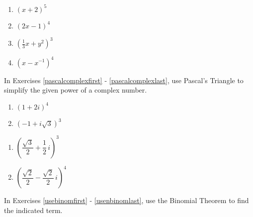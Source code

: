 \documentclass{ximera}
\begin{document}
\begin{multicols}{4}
\begin{enumerate}
\setcounter{enumi}{\value{HW}}


\item  $(x+2)^5$ \label{pascalfirst}

\item  $(2x-1)^4$

\item  $\left(\frac{1}{3} x +  y^2\right)^3$

\item  $\left(x - x^{-1} \right)^{4}$ \label{pascallast}

\setcounter{HW}{\value{enumi}}
\end{enumerate}
\end{multicols}

In Exercises \ref{pascalcomplexfirst} - \ref{pascalcomplexlast},   use Pascal's Triangle to simplify the given power of a complex number.

\begin{multicols}{2}
\begin{enumerate}
\setcounter{enumi}{\value{HW}}

\item  $(1+2i)^4$ \label{pascalcomplexfirst}

\item  $\left(-1 + i \sqrt{3}\right)^3$

\setcounter{HW}{\value{enumi}}
\end{enumerate}
\end{multicols}

\begin{multicols}{2}
\begin{enumerate}
\setcounter{enumi}{\value{HW}}

\item  $\left(\dfrac{\sqrt{3}}{2} +  \dfrac{1}{2}\, i\right)^3$

\item  $\left(\dfrac{\sqrt{2}}{2} - \dfrac{\sqrt{2}}{2} \, i\right)^4$  \label{pascalcomplexlast}

\setcounter{HW}{\value{enumi}}
\end{enumerate}
\end{multicols}

In Exercises \ref{usebinomfirst} - \ref{usenbinomlast}, use the Binomial Theorem to find the indicated term.
\end{document}
